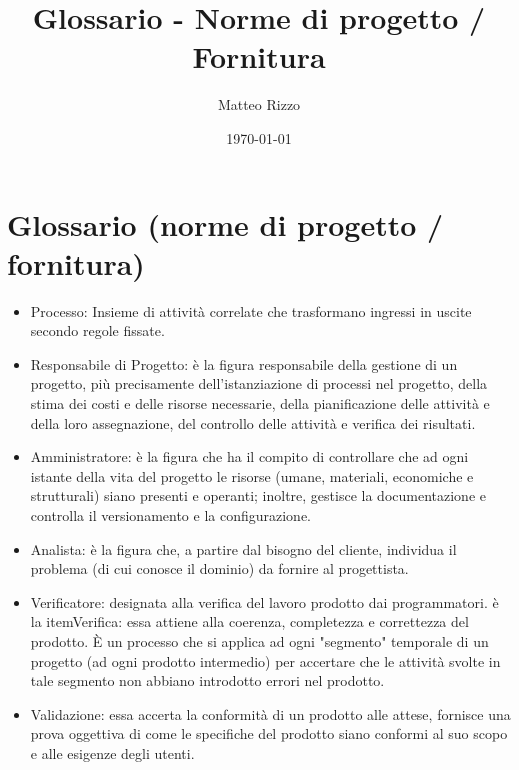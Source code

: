 \documentclass[openany,12pt,a4paper]{report}
\title{Glossario - Norme di progetto / Fornitura}
\author{Matteo Rizzo}
\date{\today}
\begin{document}
\chapter{Glossario (norme di progetto / fornitura)}

\begin{itemize}
    \item{Processo}: Insieme di attività correlate che trasformano ingressi in uscite secondo regole fissate.
    \item{Responsabile di Progetto}: è la figura responsabile della gestione di un progetto, più precisamente dell'istanziazione di processi nel progetto, della stima dei costi e delle risorse necessarie, della pianificazione delle attività e della loro assegnazione, del controllo delle attività e verifica dei risultati.
    
    \item{Amministratore}: è la figura che ha il compito di controllare che ad ogni istante della vita del progetto le risorse (umane, materiali, economiche e strutturali) siano presenti e operanti; inoltre, gestisce la documentazione e controlla il versionamento e la configurazione.
    
    \item{Analista}: è la figura che, a partire dal bisogno del cliente, individua il problema (di cui conosce il dominio) da fornire al progettista.
    
    \item{Verificatore}:
    \figura designata alla verifica del lavoro prodotto dai programmatori.
     è la item{Verifica}: essa attiene alla coerenza, completezza e correttezza del prodotto. È un processo che si applica ad ogni "segmento" temporale di un progetto (ad ogni prodotto intermedio) per accertare che le attività svolte in tale segmento non abbiano introdotto errori nel prodotto.

    \item{Validazione}: essa accerta la conformità di un prodotto alle attese, fornisce una prova oggettiva di come le specifiche del prodotto siano conformi al suo scopo e alle esigenze degli utenti.
\end{itemize}
\end{document}
